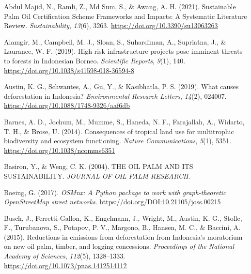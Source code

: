 \documentclass[
  letterpaper,
  DIV=11,
  numbers=noendperiod]{scrreprt}
\newlength{\cslhangindent}
\newlength{\cslentryspacingunit} %
\newenvironment{CSLReferences}[2] %
 {%
  \setlength{\parindent}{0pt}
  \ifodd #1
  \let\oldpar\par
  \def\par{\hangindent=\cslhangindent\oldpar}
  \fi
  \setlength{\parskip}{#2\cslentryspacingunit}
 }%
 {}
\begin{document}
\hypertarget{refs}{}
\begin{CSLReferences}{1}{0}
\leavevmode{}%
Abdul Majid, N., Ramli, Z., Md Sum, S., \& Awang, A. H. (2021).
Sustainable {Palm Oil Certification Scheme Frameworks} and {Impacts}: {A
Systematic Literature Review}. \emph{Sustainability}, \emph{13}(6),
3263. \url{https://doi.org/10.3390/su13063263}

\leavevmode{}%
Alamgir, M., Campbell, M. J., Sloan, S., Suhardiman, A., Supriatna, J.,
\& Laurance, W. F. (2019). High-risk infrastructure projects pose
imminent threats to forests in {Indonesian Borneo}. \emph{Scientific
Reports}, \emph{9}(1), 140.
\url{https://doi.org/10.1038/s41598-018-36594-8}

\leavevmode{}%
Austin, K. G., Schwantes, A., Gu, Y., \& Kasibhatla, P. S. (2019). What
causes deforestation in {Indonesia}? \emph{Environmental Research
Letters}, \emph{14}(2), 024007.
\url{https://doi.org/10.1088/1748-9326/aaf6db}

\leavevmode{}%
Barnes, A. D., Jochum, M., Mumme, S., Haneda, N. F., Farajallah, A.,
Widarto, T. H., \& Brose, U. (2014). Consequences of tropical land use
for multitrophic biodiversity and ecosystem functioning. \emph{Nature
Communications}, \emph{5}(1), 5351.
\url{https://doi.org/10.1038/ncomms6351}

\leavevmode{}%
Basiron, Y., \& Weng, C. K. (2004). {THE OIL PALM AND ITS
SUSTAINABILITY}. \emph{JOURNAL OF OIL PALM RESEARCH}.

\leavevmode{}%
Boeing, G. (2017). \emph{{OSMnx}: {A Python} package to work with
graph-theoretic {OpenStreetMap} street networks}.
\url{https://doi.org/DOI:10.21105/joss.00215}

\leavevmode{}%
Busch, J., Ferretti-Gallon, K., Engelmann, J., Wright, M., Austin, K.
G., Stolle, F., Turubanova, S., Potapov, P. V., Margono, B., Hansen, M.
C., \& Baccini, A. (2015). Reductions in emissions from deforestation
from {Indonesia}'s moratorium on new oil palm, timber, and logging
concessions. \emph{Proceedings of the National Academy of Sciences},
\emph{112}(5), 1328--1333. \url{https://doi.org/10.1073/pnas.1412514112}


\end{CSLReferences}
\end{document}
